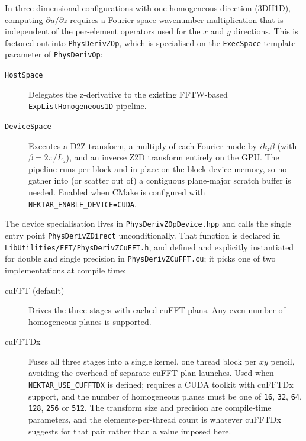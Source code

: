 In three-dimensional configurations with one homogeneous direction (3DH1D),
computing $\partial u / \partial z$ requires a Fourier-space wavenumber
multiplication that is independent of the per-element operators used for the
$x$ and $y$ directions. This is factored out into \texttt{PhysDerivZOp},
which is specialised on the \texttt{ExecSpace} template parameter of
\texttt{PhysDerivOp}:

\begin{description}
  \item[\texttt{HostSpace}] Delegates the z-derivative to the existing
    FFTW-based \texttt{ExpListHomogeneous1D} pipeline.

  \item[\texttt{DeviceSpace}] Executes a D2Z transform, a multiply of each
    Fourier mode by $i k_z \beta$ (with $\beta = 2\pi/L_z$), and an inverse
    Z2D transform entirely on the GPU. The pipeline runs per block and in
    place on the block device memory, so no gather into (or scatter out of)
    a contiguous plane-major scratch buffer is needed. Enabled when CMake is
    configured with \texttt{NEKTAR\_ENABLE\_DEVICE=CUDA}.
\end{description}

The device specialisation lives in \texttt{PhysDerivZOpDevice.hpp} and calls
the single entry point \texttt{PhysDerivZDirect} unconditionally. That
function is declared in \texttt{LibUtilities/FFT/PhysDerivZCuFFT.h}, and
defined and explicitly instantiated for double and single precision in
\texttt{PhysDerivZCuFFT.cu}; it picks one of two implementations at compile
time:

\begin{description}
  \item[cuFFT (default)] Drives the three stages with cached cuFFT plans.
    Any even number of homogeneous planes is supported.

  \item[cuFFTDx] Fuses all three stages into a single kernel, one thread
    block per $xy$ pencil, avoiding the overhead of separate cuFFT plan
    launches. Used when \texttt{NEKTAR\_USE\_CUFFTDX} is defined; requires a
    CUDA toolkit with cuFFTDx support, and the number of homogeneous planes
    must be one of \texttt{16}, \texttt{32}, \texttt{64}, \texttt{128},
    \texttt{256} or \texttt{512}. The transform size and precision are
    compile-time parameters, and the elements-per-thread count is whatever
    cuFFTDx suggests for that pair rather than a value imposed here.
\end{description}

